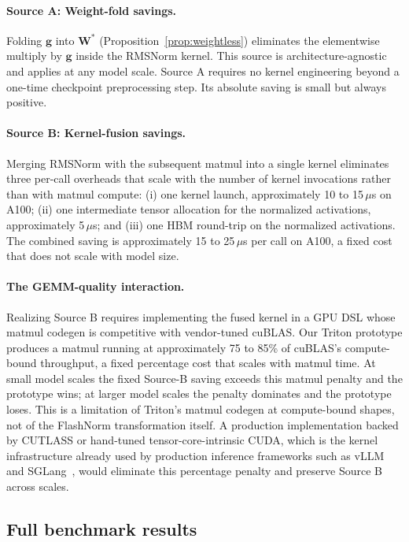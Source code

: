 \documentclass{article}
\begin{document}
\paragraph{Source A: Weight-fold savings.} Folding $\mathbf{g}$ into $\mathbf{W}^\ast$ (Proposition~\ref{prop:weightless}) eliminates the elementwise multiply by $\mathbf{g}$ inside the RMSNorm kernel. This source is architecture-agnostic and applies at any model scale. Source A requires no kernel engineering beyond a one-time checkpoint preprocessing step. Its absolute saving is small but always positive.

\paragraph{Source B: Kernel-fusion savings.} Merging RMSNorm with the subsequent matmul into a single kernel eliminates three per-call overheads that scale with the number of kernel invocations rather than with matmul compute: (i) one kernel launch, approximately 10 to 15\,$\mu$s on A100; (ii) one intermediate tensor allocation for the normalized activations, approximately 5\,$\mu$s; and (iii) one HBM round-trip on the normalized activations. The combined saving is approximately 15 to 25\,$\mu$s per call on A100, a fixed cost that does not scale with model size.

\paragraph{The GEMM-quality interaction.} Realizing Source B requires implementing the fused kernel in a GPU DSL whose matmul codegen is competitive with vendor-tuned cuBLAS. Our Triton prototype produces a matmul running at approximately 75 to 85\% of cuBLAS's compute-bound throughput, a fixed percentage cost that scales with matmul time. At small model scales the fixed Source-B saving exceeds this matmul penalty and the prototype wins; at larger model scales the penalty dominates and the prototype loses. This is a limitation of Triton's matmul codegen at compute-bound shapes, not of the FlashNorm transformation itself. A production implementation backed by CUTLASS or hand-tuned tensor-core-intrinsic CUDA, which is the kernel infrastructure already used by production inference frameworks such as vLLM~\citep{vLLM} and SGLang~\citep{sglang}, would eliminate this percentage penalty and preserve Source B across scales.

\subsection{Full benchmark results}
\end{document}
